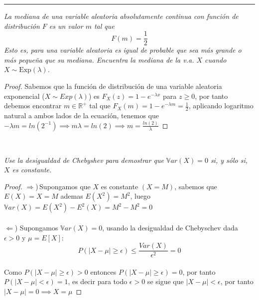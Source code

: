 \documentclass[11pt]{article}
\newcommand{\R}{\mathbb{R}}
\newcommand{\var}{\mathbb{V}ar}
\begin{document}
\rule{17cm}{0.1mm}

\begin{tcolorbox}[title = \textcolor{black}{\textcolor{white}{Problema 1}}]
\textit{
La mediana de una variable aleatoria absolutamente continua con funci\'on de distribuci\'on $F$  es un valor $m$  tal que 
\[
F(m)=\frac{1}{2}
\]
Esto es, para una variable aleatoria es igual de probable que sea m\'as grande o m\'as pequeña que su mediana. Encuentra la mediana de la v.a. $X$ cuando $X\sim\mbox{Exp}(\lambda)$.
}
\end{tcolorbox}
\begin{proof}
    Sabemos que la funci\'on de distribuci\'on de una variable aleatoria exponencial ($X\sim Exp(\lambda)$) es $F_{X}(z)=1-e^{-\lambda x}$ para $z\geq 0$, por tanto debemos encontrar
    $m\in \R^+$ tal que $F_{X}(m)=1-e^{-\lambda m}=\frac{1}{2}$, aplicando logaritmo natural a ambos lados de la ecuaci\'on, tenemos que $-\lambda m=ln(2^{-1})\implies m \lambda=ln(2)\implies m=\frac{ln(2)}{\lambda}$
\end{proof}\,\\

\begin{tcolorbox}[title = \textcolor{black}{\textcolor{white}{Problema 2}}]
\textit{
Use la desigualdad de Chebyshev para demostrar  que $\var(X)=0$ si, y s\'olo si, $X$ es constante. }
\end{tcolorbox}
\begin{proof}
    $\Rightarrow$)\,Supongamos que $X$ es constante $(X=M)$, sabemos que $E(X)=X=M$ ademas $E(X^2)=M^2$, luego
    $\var(X)=E(X^2)-E^2(X)=M^2-M^2=0$\,\\
    \,\\
    $\Leftarrow$) Supongamos $\var(X)=0$, usando la desigualdad de Chebyschev dada $\epsilon>0$ y $\mu=E[X]$:\,\\
    \begin{equation*}
        P(|X-\mu|\geq \epsilon)\leq \frac{Var(X)}{\epsilon^2}=0
    \end{equation*}\,\\
    Como $P(|X-\mu|\geq \epsilon)>0$ entonces $P(|X-\mu|\geq \epsilon)=0$, por tanto $P(|X-\mu|< \epsilon)=1$, es decir para todo $\epsilon>0$ se sigue que
    $|X-\mu|<\epsilon$, por tanto $|X-\mu|=0\implies X=\mu$
\end{proof}
\newpage
\end{document}
